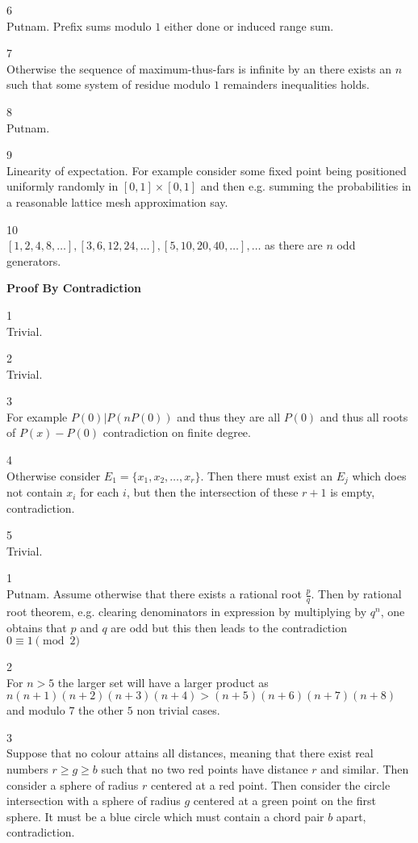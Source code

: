 6 \\
Putnam. Prefix sums modulo $1$ either done or induced range sum.

7 \\
Otherwise the sequence of maximum-thus-fars is infinite by an there exists an $n$ such that some system of residue modulo $1$ remainders inequalities holds.

8 \\
Putnam.

9 \\
Linearity of expectation. For example consider some fixed point being positioned uniformly randomly in $[0,1] \times [0,1]$ and then e.g. summing the probabilities in a reasonable lattice mesh approximation say.

10 \\
$[1,2,4,8,\dots ],[3,6,12,24,\dots ],[5,10,20,40,\dots ],\dots$ as there are $n$ odd generators.

\newpage

\textbf{Proof By Contradiction}

1 \\
Trivial.

2 \\
Trivial.

3 \\
For example $P(0) | P(nP(0))$ and thus they are all $P(0)$ and thus all roots of $P(x)-P(0)$ contradiction on finite degree.

4 \\
Otherwise consider $E_1=\{x_1,x_2,\dots,x_r \}$. Then there must exist an $E_j$ which does not contain $x_i$ for each $i$, but then the intersection of these $r+1$ is empty, contradiction.

5 \\
Trivial.

1 \\
Putnam. Assume otherwise that there exists a rational root $\frac{p}{q}$. Then by rational root theorem, e.g. clearing denominators in expression by multiplying by $q^n$, one obtains that $p$ and $q$ are odd but this then leads to the contradiction $0 \equiv 1 \pmod{2}$

2 \\
For $n>5$ the larger set will have a larger product as $n(n+1)(n+2)(n+3)(n+4)>(n+5)(n+6)(n+7)(n+8)$ and modulo $7$ the other $5$ non trivial cases.

3 \\
Suppose that no colour attains all distances, meaning that there exist real numbers $r \ge g \ge b$ such that no two red points have distance $r$ and similar. Then consider a sphere of radius $r$ centered at a red point. Then consider the circle intersection with a sphere of radius $g$ centered at a green point on the first sphere. It must be a blue circle which must contain a chord pair $b$ apart, contradiction.

